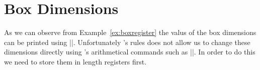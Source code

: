 \section{Box Dimensions}

As we can observe from Example~\ref{ex:boxregister} the valus of the box dimensions can be printed using |\the|. Unfortunately \tex's rules does not allow us to change these dimensions directly using \tex's arithmetical commands such as |\advance|. In order to do this we need to store them in length registers first.

